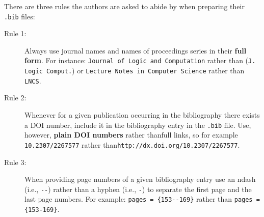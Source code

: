 \documentclass[manuscript]{BSLstyle} %
\begin{document}
There are three rules the authors are asked to abide by when preparing their \texttt{.bib} files:

\begin{description}
	\item[Rule 1:] Always use journal names and names of proceedings series in their \textbf{full form}. For instance: \texttt{Journal of Logic and Computation} rather than (\texttt{J. Logic Comput.}) or \texttt{Lecture Notes in Computer Science} rather than \texttt{LNCS}.
	\item[Rule 2:] Whenever for a given publication occurring in the bibliography there exists a DOI number, include it in the bibliography entry in the \texttt{.bib} file. Use, however, \textbf{plain DOI numbers} rather than\linebreak full links, so for example \texttt{10.2307/2267577} rather than\linebreak \texttt{http://dx.doi.org/10.2307/2267577}.
	\item[Rule 3:] When providing page numbers of a given bibliography entry use an ndash (i.e., \texttt{{-}{-}}) rather than a hyphen (i.e., \texttt{-}) to separate the first page and the last page numbers. For example: \texttt{pages = \{153{-}{-}169\}} rather than \texttt{pages = \{153-169\}}.
\end{description}




\end{document}
